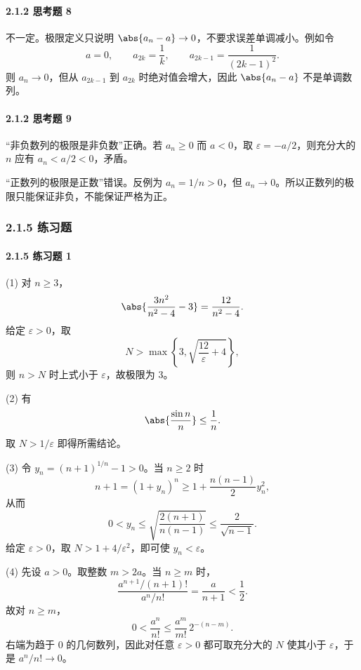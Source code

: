 \paragraph{2.1.2 思考题 8}
\begin{xsolution}
不一定。极限定义只说明 $\abs{a_n-a}\to0$，不要求误差单调减小。例如令
\[
  a=0,\qquad
  a_{2k}=\frac1k,\qquad
  a_{2k-1}=\frac1{(2k-1)^2}.
\]
则 $a_n\to0$，但从 $a_{2k-1}$ 到 $a_{2k}$ 时绝对值会增大，因此 $\abs{a_n-a}$ 不是单调数列。
\end{xsolution}

\paragraph{2.1.2 思考题 9}
\begin{xsolution}
“非负数列的极限是非负数”正确。若 $a_n\ge0$ 而 $a<0$，取 $\varepsilon=-a/2$，则充分大的 $n$ 应有 $a_n<a/2<0$，矛盾。

“正数列的极限是正数”错误。反例为 $a_n=1/n>0$，但 $a_n\to0$。所以正数列的极限只能保证非负，不能保证严格为正。
\end{xsolution}

\subsubsection*{2.1.5 练习题}

\paragraph{2.1.5 练习题 1}
\begin{xsolution}
(1) 对 $n\ge3$，
\[
  \abs{\frac{3n^2}{n^2-4}-3}
  =\frac{12}{n^2-4}.
\]
给定 $\varepsilon>0$，取
\[
  N>\max\left\{3,\sqrt{\frac{12}{\varepsilon}+4}\right\},
\]
则 $n>N$ 时上式小于 $\varepsilon$，故极限为 $3$。

(2) 有
\[
  \abs{\frac{\sin n}{n}}\le\frac1n.
\]
取 $N>1/\varepsilon$ 即得所需结论。

(3) 令 $y_n=(n+1)^{1/n}-1>0$。当 $n\ge2$ 时
\[
  n+1=(1+y_n)^n\ge1+\frac{n(n-1)}2y_n^2,
\]
从而
\[
  0<y_n\le\sqrt{\frac{2(n+1)}{n(n-1)}}
  \le\frac2{\sqrt{n-1}}.
\]
给定 $\varepsilon>0$，取 $N>1+4/\varepsilon^2$，即可使 $y_n<\varepsilon$。

(4) 先设 $a>0$。取整数 $m>2a$。当 $n\ge m$ 时，
\[
  \frac{a^{n+1}/(n+1)!}{a^n/n!}=\frac a{n+1}<\frac12.
\]
故对 $n\ge m$，
\[
  0<\frac{a^n}{n!}
  \le \frac{a^m}{m!}\,2^{-(n-m)}.
\]
右端为趋于 $0$ 的几何数列，因此对任意 $\varepsilon>0$ 都可取充分大的 $N$ 使其小于 $\varepsilon$，于是 $a^n/n!\to0$。
\end{xsolution}

